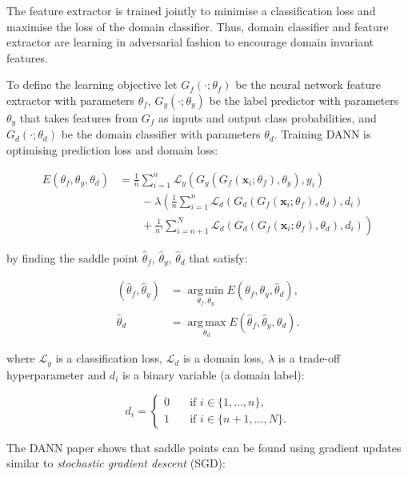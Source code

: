 The feature extractor is trained jointly to minimise a classification loss
and maximise the loss of the domain classifier.
Thus, domain classifier and feature extractor are learning in adversarial fashion to encourage domain invariant features.

To define the learning objective let
\(G_f(\cdot; \theta_f)\) be the neural network feature extractor with parameters \(\theta_f\),
\(G_y(\cdot; \theta_y)\) be the label predictor with parameters \(\theta_y\)
that takes features from \(G_f\) as inputs and output class probabilities,
and \(G_d(\cdot; \theta_d)\) be the domain classifier with parameters \(\theta_d\). 
Training DANN is optimising prediction loss and domain loss:

\begin{align}
	E(\theta_f, \theta_y, \theta_d) &= \frac{1}{n} \sum^{n}_{i = 1} \mathcal{L}_y(G_y(G_f(\mathbf{x}_i; \theta_f), \theta_y), y_i) \nonumber \\
	&\qquad {} - \lambda \left(\frac{1}{n} \sum^{n}_{i = 1} \mathcal{L}_d(G_d(G_f(\mathbf{x}_i; \theta_f), \theta_d), d_i) \right. \nonumber \\
	&\qquad \left. {} + \frac{1}{n'} \sum^{N}_{i = n + 1} \mathcal{L}_d(G_d(G_f(\mathbf{x}_i; \theta_f), \theta_d), d_i)\right)
\end{align}

by finding the saddle point \(\hat{\theta}_f\), \(\hat{\theta}_y\), \(\hat{\theta}_d\) that satisfy:

\begin{align}
	(\hat{\theta}_f, \hat{\theta}_y)
	&= \operatorname*{arg\,min}_{\theta_f, \theta_y} E(\theta_f, \theta_y, \hat{\theta}_d),\\
	\hat{\theta}_d
	&= \operatorname*{arg\,max}_{\theta_d} E(\hat{\theta}_f, \hat{\theta}_y, \theta_d).
\end{align}

where \(\mathcal{L}_y\) is a classification loss,
\(\mathcal{L}_d\) is a domain loss,
\(\lambda\) is a trade-off hyperparameter
and \(d_i\) is a binary variable (a domain label):

\begin{equation}
	d_i =
	\begin{cases}
		0 & \quad \text{if } i \in \{1, \dots, n\}, \\
		1 & \quad \text{if } i \in \{n + 1, \dots, N\}.
	\end{cases}
\end{equation}

The DANN paper shows that saddle points can be found using gradient updates
similar to \textit{stochastic gradient descent} (SGD):

